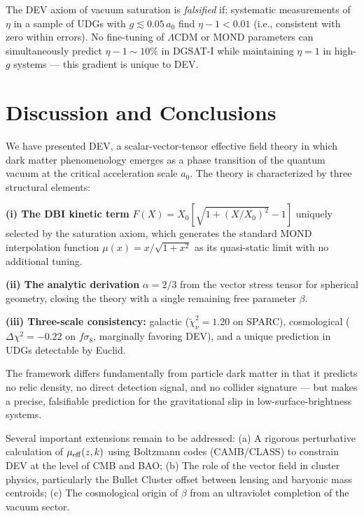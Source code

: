 \documentclass[aps,prd,twocolumn,showpacs,superscriptaddress]{revtex4-2}
\newcommand{\aO}{a_0}
\newcommand{\Xzero}{X_0}
\newcommand{\mueff}{\mu_{\rm eff}}
\newcommand{\LCDM}{$\Lambda$CDM}
\begin{document}
The DEV axiom of vacuum saturation is \emph{falsified} if:
systematic measurements of $\eta$ in a sample of UDGs with
$g \lesssim 0.05\,\aO$ find $\eta - 1 < 0.01$ (i.e., consistent
with zero within errors).
No fine-tuning of \LCDM{} or MOND parameters can simultaneously
predict $\eta - 1 \sim 10\%$ in DGSAT-I while maintaining
$\eta = 1$ in high-$g$ systems — this gradient is unique to DEV.

\section{Discussion and Conclusions}
\label{sec:conclusion}

We have presented DEV, a scalar-vector-tensor effective field theory
in which dark matter phenomenology emerges as a phase transition of
the quantum vacuum at the critical acceleration scale $\aO$.
The theory is characterized by three structural elements:

\textbf{(i) The DBI kinetic term} $F(X) = \Xzero[\sqrt{1+(X/\Xzero)^2}-1]$
uniquely selected by the saturation axiom, which generates the
standard MOND interpolation function $\mu(x) = x/\sqrt{1+x^2}$
as its quasi-static limit with no additional tuning.

\textbf{(ii) The analytic derivation} $\alpha = 2/3$ from the vector
stress tensor for spherical geometry, closing the theory with a
single remaining free parameter $\beta$.

\textbf{(iii) Three-scale consistency:}
galactic ($\widetilde\chi^2_\nu = 1.20$ on SPARC),
cosmological ($\Delta\chi^2 = -0.22$ on $f\sigma_8$,
marginally favoring DEV),
and a unique prediction in UDGs detectable by Euclid.

The framework differs fundamentally from particle dark matter
in that it predicts no relic density, no direct detection signal,
and no collider signature — but makes a precise, falsifiable
prediction for the gravitational slip in low-surface-brightness systems.

Several important extensions remain to be addressed:
(a) A rigorous perturbative calculation of $\mueff(z,k)$
    using Boltzmann codes (CAMB/CLASS) to constrain DEV at the
    level of CMB and BAO;
(b) The role of the vector field in cluster physics,
    particularly the Bullet Cluster offset between lensing
    and baryonic mass centroids;
(c) The cosmological origin of $\beta$ from an ultraviolet
    completion of the vacuum sector.
\end{document}
